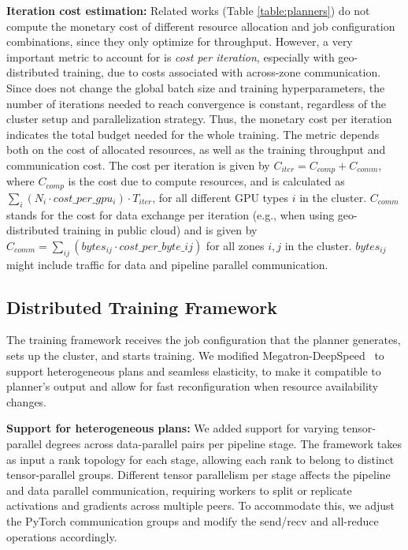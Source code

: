 \textbf{Iteration cost estimation:} Related works (Table \ref{table:planners}) do not compute the monetary cost of different resource allocation and job configuration combinations, since they only optimize for throughput. However, a very important metric to account for is \textit{cost per iteration}, especially with geo-distributed training, due to costs associated with across-zone communication. Since \sailor does not change the global batch size and training hyperparameters, the number of iterations needed to reach convergence is constant, regardless of the cluster setup and parallelization strategy. Thus, the monetary cost per iteration indicates the total budget needed for the whole training. The metric depends both on the cost of allocated resources, as well as the training throughput and communication cost. The cost per iteration is given by $C_{iter} = C_{comp} + C_{comm}$, where $C_{comp}$ is the cost due to compute resources, and is calculated as $\sum_i({N_i \cdot cost\_per\_gpu_i}) \cdot T_{iter}$, for all different GPU types $i$ in the cluster. $C_{comm}$ stands for the cost for data exchange per iteration (e.g., when using geo-distributed training in public cloud) and is given by $C_{comm} = \sum_{ij}(bytes_{ij} \cdot cost\_per\_byte\_{ij})$ for all zones $i,j$ in the cluster. $bytes_{ij}$ might include traffic for data and pipeline parallel communication.

\subsection{\sailor Distributed Training Framework}\label{framework}

The \sailor training framework receives the job configuration that the planner generates, sets up the cluster, and starts training. We modified Megatron-DeepSpeed~\cite{megatron-deepspeed} to support heterogeneous plans and seamless elasticity, to make it compatible to planner's output and allow for fast reconfiguration when resource availability changes.

\textbf{Support for heterogeneous plans:} We added support for varying tensor-parallel degrees across data-parallel pairs per pipeline stage. The framework takes as input a rank topology for each stage, allowing each rank to belong to distinct tensor-parallel groups. Different tensor parallelism per stage affects the pipeline and data parallel communication, requiring workers to split or replicate activations and gradients across multiple peers. To accommodate this, we adjust the PyTorch communication groups and modify the send/recv and all-reduce operations accordingly.

